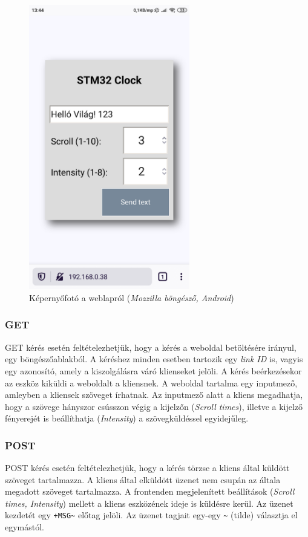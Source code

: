 \documentclass[a4paper, 12pt]{article}
\begin{document}
\begin{figure}[ht]
	\centering
	\includegraphics[width = 7cm]{images/webpage.png}
	\caption{Képernyőfotó a weblapról (\textit{Mozzilla böngésző, Android})}
	\label{fig:webpage}
\end{figure}	

\subsubsection{GET}

GET kérés esetén feltételezhetjük, hogy a kérés a weboldal betöltésére irányul, egy böngészőablakból. A kéréshez minden esetben tartozik egy \textit{link ID} is, vagyis egy azonosító, amely a kiszolgálásra váró klienseket jelöli. A kérés beérkezésekor az eszköz kiküldi a weboldalt a kliensnek. A weboldal tartalma egy inputmező, amleyben a kliensek szöveget írhatnak. Az inputmező alatt a kliens megadhatja, hogy a szövege hányszor csússzon végig a kijelzőn (\textit{Scroll times}), illetve a kijelző fényerejét is beállíthatja (\textit{Intensity}) a szövegküldéssel egyidejűleg.

\subsubsection{POST}

POST kérés esetén feltételezhetjük, hogy a kérés törzse a kliens által küldött szöveget tartalmazza.
A kliens által elküldött üzenet nem csupán az általa megadott szöveget tartalmazza. A frontenden megjelenített beállítások (\textit{Scroll times, Intensity}) mellett a kliens eszközének ideje is küldésre kerül.
Az üzenet kezdetét egy \texttt{+MSG\~} előtag jelöli. Az üzenet tagjait egy-egy \texttt{\~} (tilde) választja el egymástól.
\end{document}
